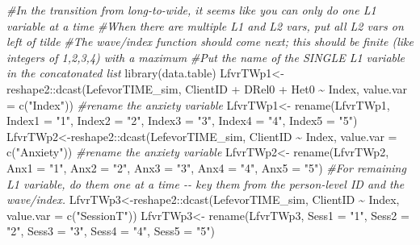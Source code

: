 \documentclass[
  english,
]{book}
\newenvironment{Shaded}{\begin{snugshade}}{\end{snugshade}}
\newcommand{\AttributeTok}[1]{\textcolor[rgb]{0.77,0.63,0.00}{#1}}
\newcommand{\CommentTok}[1]{\textcolor[rgb]{0.56,0.35,0.01}{\textit{#1}}}
\newcommand{\FunctionTok}[1]{\textcolor[rgb]{0.00,0.00,0.00}{#1}}
\newcommand{\NormalTok}[1]{#1}
\newcommand{\OtherTok}[1]{\textcolor[rgb]{0.56,0.35,0.01}{#1}}
\newcommand{\SpecialCharTok}[1]{\textcolor[rgb]{0.00,0.00,0.00}{#1}}
\newcommand{\StringTok}[1]{\textcolor[rgb]{0.31,0.60,0.02}{#1}}
\begin{document}
\begin{Shaded}
\begin{Highlighting}[]
\CommentTok{\#In the transition from long{-}to{-}wide, it seems like you can only do one L1 variable at a time}
\CommentTok{\#When there are multiple L1 and L2 vars, put all L2 vars on left of tilde}
\CommentTok{\#The wave/index function should come next; this should be finite (like integers of 1,2,3,4) with a maximum}
\CommentTok{\#Put the name of the SINGLE L1 variable in the concatonated list}
\FunctionTok{library}\NormalTok{(data.table)}
\NormalTok{LfvrTWp1}\OtherTok{\textless{}{-}}\NormalTok{reshape2}\SpecialCharTok{::}\FunctionTok{dcast}\NormalTok{(LefevorTIME\_sim, ClientID }\SpecialCharTok{+}\NormalTok{ DRel0 }\SpecialCharTok{+}\NormalTok{ Het0 }\SpecialCharTok{\textasciitilde{}}\NormalTok{ Index, }\AttributeTok{value.var =} \FunctionTok{c}\NormalTok{(}\StringTok{"Index"}\NormalTok{))}
\CommentTok{\#rename the anxiety variable}
\NormalTok{LfvrTWp1}\OtherTok{\textless{}{-}}  \FunctionTok{rename}\NormalTok{(LfvrTWp1, }\AttributeTok{Index1 =} \StringTok{"1"}\NormalTok{, }\AttributeTok{Index2 =} \StringTok{"2"}\NormalTok{, }\AttributeTok{Index3 =} \StringTok{"3"}\NormalTok{, }\AttributeTok{Index4 =} \StringTok{"4"}\NormalTok{, }\AttributeTok{Index5 =} \StringTok{"5"}\NormalTok{)}
\NormalTok{LfvrTWp2}\OtherTok{\textless{}{-}}\NormalTok{reshape2}\SpecialCharTok{::}\FunctionTok{dcast}\NormalTok{(LefevorTIME\_sim, ClientID }\SpecialCharTok{\textasciitilde{}}\NormalTok{ Index, }\AttributeTok{value.var =} \FunctionTok{c}\NormalTok{(}\StringTok{"Anxiety"}\NormalTok{))}
\CommentTok{\#rename the anxiety variable}
\NormalTok{LfvrTWp2}\OtherTok{\textless{}{-}}  \FunctionTok{rename}\NormalTok{(LfvrTWp2, }\AttributeTok{Anx1 =} \StringTok{"1"}\NormalTok{, }\AttributeTok{Anx2 =} \StringTok{"2"}\NormalTok{, }\AttributeTok{Anx3 =} \StringTok{"3"}\NormalTok{, }\AttributeTok{Anx4 =} \StringTok{"4"}\NormalTok{, }\AttributeTok{Anx5 =} \StringTok{"5"}\NormalTok{)}
\CommentTok{\#For remaining L1 variable, do them one at a time {-}{-} key them from the person{-}level ID and the wave/index.}
\NormalTok{LfvrTWp3}\OtherTok{\textless{}{-}}\NormalTok{reshape2}\SpecialCharTok{::}\FunctionTok{dcast}\NormalTok{(LefevorTIME\_sim, ClientID }\SpecialCharTok{\textasciitilde{}}\NormalTok{ Index, }\AttributeTok{value.var =} \FunctionTok{c}\NormalTok{(}\StringTok{"SessionT"}\NormalTok{))}
\NormalTok{LfvrTWp3}\OtherTok{\textless{}{-}}  \FunctionTok{rename}\NormalTok{(LfvrTWp3, }\AttributeTok{Sess1 =} \StringTok{"1"}\NormalTok{, }\AttributeTok{Sess2 =} \StringTok{"2"}\NormalTok{, }\AttributeTok{Sess3 =} \StringTok{"3"}\NormalTok{, }\AttributeTok{Sess4 =} \StringTok{"4"}\NormalTok{, }\AttributeTok{Sess5 =} \StringTok{"5"}\NormalTok{)}

\end{Highlighting}
\end{Shaded}
\end{document}
